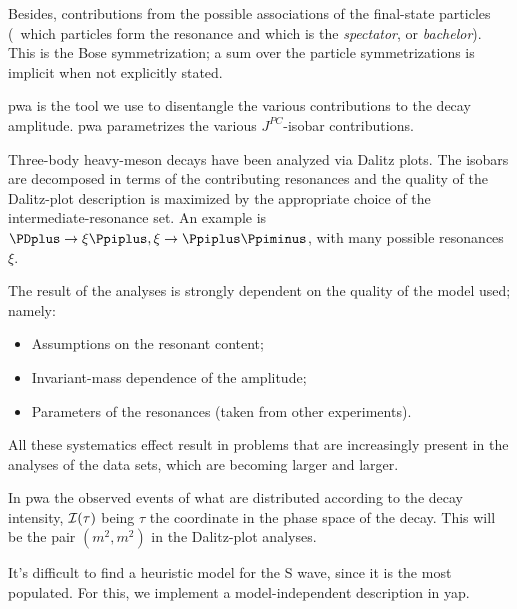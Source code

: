     Besides, contributions from the possible associations of the final-state particles (\ie~which particles form the resonance and which is the \emph{spectator}, or \emph{bachelor}).
    This is the Bose symmetrization; a sum over the particle symmetrizations is implicit when not explicitly stated.


    \ac{pwa} is the tool we use to disentangle the various contributions to the decay amplitude.
    \ac{pwa} parametrizes the various $J^{PC}$-isobar contributions.


    Three-body heavy-meson decays have been analyzed via Dalitz plots.
    The isobars are decomposed in terms of the contributing resonances and the quality of the Dalitz-plot description is maximized by the appropriate choice of the intermediate-resonance set.
    An example is $ \PDplus\to\xi\Ppiplus, \xi\to\Ppiplus\Ppiminus$, with many possible resonances $\xi$.


    The result of the analyses is strongly dependent on the quality of the model used; namely:
    \begin{itemize}
        \item Assumptions on the resonant content;
        \item Invariant-mass dependence of the amplitude;
        \item Parameters of the resonances (taken from other experiments).
    \end{itemize}
    All these systematics effect result in problems that are increasingly present in the analyses of the data sets, which are becoming larger and larger.

    In \ac{pwa} the observed events {\color{red} of what} are distributed according to the decay intensity, $\mathcal{I}(\tau)$ being $\tau$ the coordinate in the phase space of the decay.
    {\color{red} This will be the pair $(m^2,m^2)$ in the Dalitz-plot analyses.}

    {\color{red}
    It's difficult to find a heuristic model for the S wave, since it is the most populated.
    For this, we implement a model-independent description in \ac{yap}.
    }
